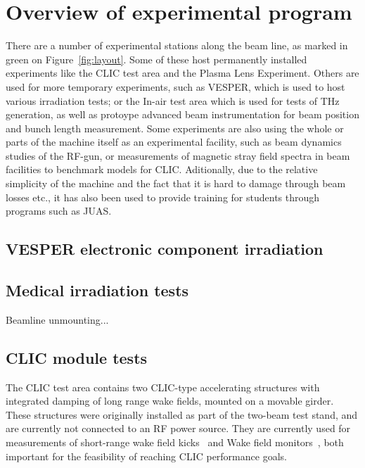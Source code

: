 \documentclass[a4paper,
               keeplastbox,   %
               ]{jacow}
\begin{document}
\section{Overview of experimental program}

There are a number of experimental stations along the beam line, as marked in green on Figure~\ref{fig:layout}.
Some of these host permanently installed experiments like the CLIC test area and the Plasma Lens Experiment.
Others are used for more temporary experiments, such as VESPER, which is used to host various irradiation tests; or the In-air test area which is used for tests of THz generation, as well as protoype advanced beam instrumentation for beam position and bunch length measurement.
Some experiments are also using the whole or parts of the machine itself as an experimental facility, such as beam dynamics studies of the RF-gun, or measurements of magnetic stray field spectra in beam facilities to benchmark models for CLIC.
Aditionally, due to the relative simplicity of the machine and the fact that it is hard to damage through beam losses etc., it has also been used to provide training for students through programs such as JUAS.



\subsection{VESPER electronic component irradiation}

\subsection{Medical irradiation tests}
Beamline unmounting...

\subsection{CLIC module tests}
The CLIC test area contains two CLIC-type accelerating structures with integrated damping of long range wake fields, mounted on a movable girder.
These structures were originally installed as part of the two-beam test stand, and are currently not connected to an RF power source.
They are currently used for measurements of short-range wake field kicks~\cite{Antonio::IEEE-Kicks} and Wake field monitors~\cite{KyrreSjobak::CLICWS19}, both important for the feasibility of reaching CLIC performance goals.
\end{document}

